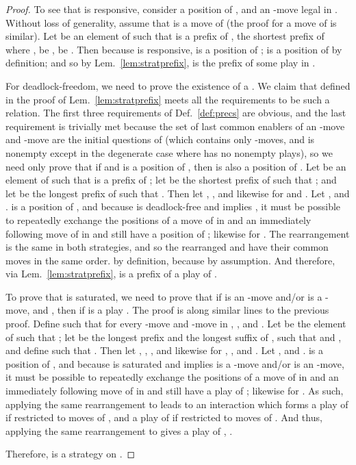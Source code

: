 \documentclass{article}
\begin{document}
\begin{proof}
  To see that  is responsive, consider a position  of , and an -move  legal in . Without loss of generality, assume that  is a move of  (the proof for  a move of  is similar). Let  be an element of  such that  is a prefix of ,  the shortest prefix of  where ,  be ,  be . Then because  is responsive,  is a position of ;  is a position of  by definition; and so by Lem.~\ref{lem:stratprefix},  is the prefix of some play in .

  For deadlock-freedom, we need to prove the existence of a . We claim that  defined in the proof of Lem.~\ref{lem:stratprefix} meets all the requirements to be such a relation. The first three requirements of Def.~\ref{def:precs} are obvious, and the last requirement is trivially met because the set of last common enablers of an -move and -move are the initial questions of  (which contains only -moves, and is nonempty except in the degenerate case where  has no nonempty plays), so we need only prove that if  and  is a position of , then  is also a position of . Let  be an element of  such that  is a prefix of ; let  be the shortest prefix of  such that ; and let  be the longest prefix of  such that . Then let , , and likewise for  and . Let , and .  is a position of , and because  is deadlock-free and  implies , it must be possible to repeatedly exchange the positions of a move of  in  and an immediately following move of  in  and still have a position of ; likewise for . The rearrangement is the same in both strategies, and so the rearranged  and  have their common moves in the same order.  by definition,  because  by assumption. And therefore, via Lem.~\ref{lem:stratprefix},  is a prefix of a play of .

To prove that  is saturated, we need to prove that if  is an -move and/or  is a
 -move, and , then if  is a play . The proof is
 along similar lines to the previous proof. Define  such that  for every
 -move  and -move  in , , and . Let  be the element of
  such that ; let  be the longest
 prefix and  the longest suffix of , such that 
 and , and define  such that . 
Then let , ,
 , and likewise for , , and . Let , and .
  is a position of , and because  is saturated and  implies  is a -move and/or  is an -move, it must be possible to repeatedly
 exchange the positions of a move of  in  and an immediately following move of  in  and still
 have a play of ; likewise for . As such, applying the same rearrangement to  leads to 
an interaction which forms a play of  if restricted to moves of , and a play of  if restricted
 to moves of . And thus, applying the same rearrangement to  gives a play of ,
 .

  Therefore,  is a strategy on .
\end{proof}
\end{document}
